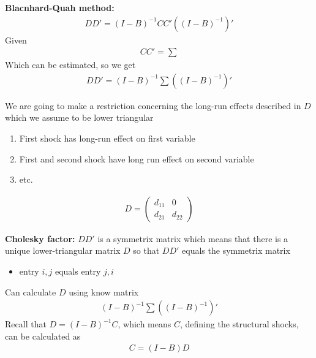 \documentclass{beamer}
\begin{document}
\begin{frame}
  \textbf{Blacnhard-Quah method:}
  \begin{align}
    DD'=(I-B)^{-1}CC'\left( (I-B)^{-1} \right)'
  \end{align}
  Given 
  \begin{align}
    CC'= \sum 
  \end{align}
  \medskip
  Which can be estimated, so we get
  \begin{align}
    DD'=(I-B)^{-1}\sum \left( (I-B)^{-1} \right)'
  \end{align} 
\end{frame}

\begin{frame}
  We are going to make a restriction concerning the long-run effects described in $D$ which we assume to be lower triangular
  \begin{enumerate}
    \item First shock has long-run effect on first variable
    \item First and second shock have long run effect on second variable
    \item etc.
  \end{enumerate}
  \begin{align}
    D= \begin{pmatrix} d_{11} & 0 \\ d_{21} & d_{22} \end{pmatrix}
  \end{align}
\end{frame}

\begin{frame}
  \textbf{Cholesky factor:} $DD'$ is a symmetrix matrix which means that there is a unique lower-triangular matrix $D$ so that $DD'$ equals the symmetrix matrix
  \begin{itemize}
    \item entry $i,j$ equals entry $j,i$
  \end{itemize}
  \medskip
  Can calculate $D$ using know matrix
  \begin{align}
    (I-B)^{-1}\sum \left( (I-B)^{-1} \right)'
  \end{align}
  \medskip
  Recall that $D=(I-B)^{-1}C$, which means $C$, defining the structural shocks, can be calculated as
  \begin{align}
    C=(I-B)D
  \end{align}
\end{frame}


\end{document}
